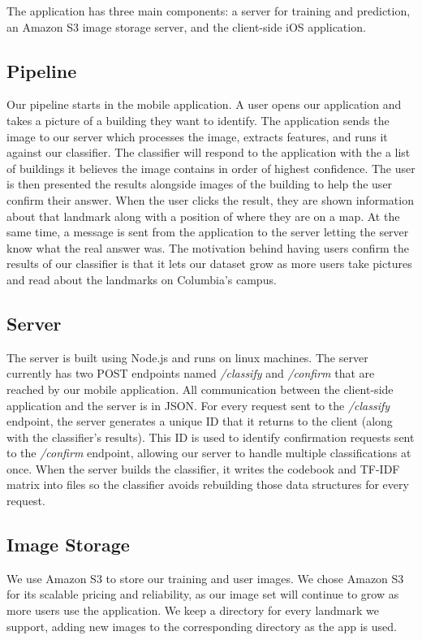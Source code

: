The application has three main components: a server for training and prediction, an Amazon S3 image storage server, and the client-side iOS application. 

\subsection{Pipeline}
Our pipeline starts in the mobile application. A user opens our application and takes a picture of a building they want to identify. The application sends the image to our server which processes the image, extracts features, and runs it against our classifier. The classifier will respond to the application with the a list of buildings it believes the image contains in order of highest confidence. The user is then presented the results alongside images of the building to help the user confirm their answer. When the user clicks the result, they are shown information about that landmark along with a position of where they are on a map. At the same time, a message is sent from the application to the server letting the server know what the real answer was. The motivation behind having users confirm the results of our classifier is that it lets our dataset grow as more users take pictures and read about the landmarks on Columbia's campus.

\subsection{Server}
The server is built using Node.js and runs on linux machines. The server currently has two POST endpoints named \textit{/classify} and \textit{/confirm} that are reached by our mobile application. All communication between the client-side application and the server is in JSON. For every request sent to the \textit{/classify} endpoint, the server generates a unique ID that it returns to the client (along with the classifier's results). This ID is used to identify confirmation requests sent to the \textit{/confirm} endpoint, allowing our server to handle multiple classifications at once. When the server builds the classifier, it writes the codebook and TF-IDF matrix into files so the classifier avoids rebuilding those data structures for every request.

\subsection{Image Storage}
We use Amazon S3 to store our training and user images. We chose Amazon S3 for its scalable pricing and reliability, as our image set will continue to grow as more users use the application. We keep a directory for every landmark we support, adding new images to the corresponding directory as the app is used. 

